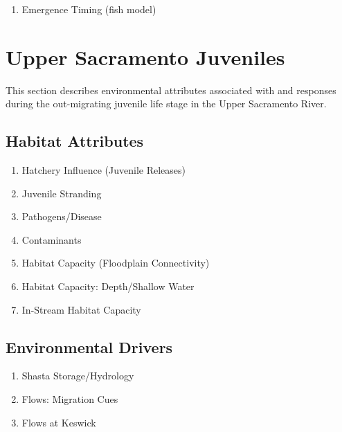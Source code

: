 \documentclass[
]{book}
\providecommand{\tightlist}{%
  \setlength{\itemsep}{0pt}\setlength{\parskip}{0pt}}
\theoremstyle{definition}
\theoremstyle{definition}
\theoremstyle{definition}
\theoremstyle{definition}
\theoremstyle{remark}
\begin{document}
\begin{enumerate}
\def\labelenumi{\arabic{enumi}.}
\setcounter{enumi}{2}
\tightlist
\item
  Emergence Timing (fish model)
\end{enumerate}

\hypertarget{upper-sacramento-juveniles}{%
\chapter{Upper Sacramento Juveniles}\label{upper-sacramento-juveniles}}

This section describes environmental attributes associated with and responses during the out-migrating juvenile life stage in the Upper Sacramento River.

\hypertarget{habitat-attributes-2}{%
\section{Habitat Attributes}\label{habitat-attributes-2}}

\begin{enumerate}
\def\labelenumi{\arabic{enumi}.}
\item
  Hatchery Influence (Juvenile Releases)
\item
  Juvenile Stranding
\item
  Pathogens/Disease
\item
  Contaminants
\item
  Habitat Capacity (Floodplain Connectivity)
\item
  Habitat Capacity: Depth/Shallow Water
\item
  In-Stream Habitat Capacity
\end{enumerate}

\hypertarget{environmental-drivers-1}{%
\section{Environmental Drivers}\label{environmental-drivers-1}}

\begin{enumerate}
\def\labelenumi{\arabic{enumi}.}
\item
  Shasta Storage/Hydrology
\item
  Flows: Migration Cues
\item
  Flows at Keswick
\end{enumerate}
\end{document}

